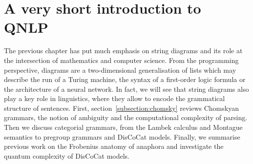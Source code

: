 
\section{A very short introduction to QNLP}\label{section:NLP}

The previous chapter has put much emphasis on string diagrams and its role at the intersection of mathematics and computer science.
From the programming perspective, diagrams are a two-dimensional generalisation of lists which may describe the run of a Turing machine, the syntax of a first-order logic formula or the architecture of a neural network.
In fact, we will see that string diagrams also play a key role in linguistics, where they allow to encode the grammatical structure of sentences.
First, section~\ref{subsection:chomsky} reviews Chomskyan grammars, the notion of ambiguity and the computational complexity of parsing.
Then we discuss categorial grammars, from the Lambek calculus and Montague semantics to pregroup grammars and DisCoCat models.
Finally, we summarise previous work on the Frobenius anatomy of anaphora and investigate the quantum complexity of DisCoCat models.

%
%
%
%

